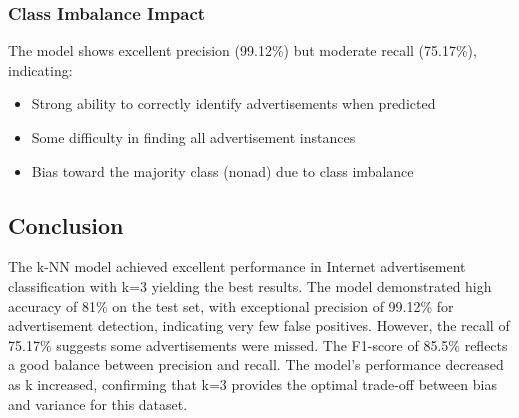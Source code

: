 \subsubsection{Class Imbalance Impact}
The model shows excellent precision (99.12\%) but moderate recall (75.17\%), indicating:
\begin{itemize}
    \item Strong ability to correctly identify advertisements when predicted
    \item Some difficulty in finding all advertisement instances
    \item Bias toward the majority class (nonad) due to class imbalance
\end{itemize}

\subsection{Conclusion}
The k-NN model achieved excellent performance in Internet advertisement classification with k=3 yielding the best results. The model demonstrated high accuracy of 81\% on the test set, with exceptional precision of 99.12\% for advertisement detection, indicating very few false positives. However, the recall of 75.17\% suggests some advertisements were missed. The F1-score of 85.5\% reflects a good balance between precision and recall. The model's performance decreased as k increased, confirming that k=3 provides the optimal trade-off between bias and variance for this dataset.